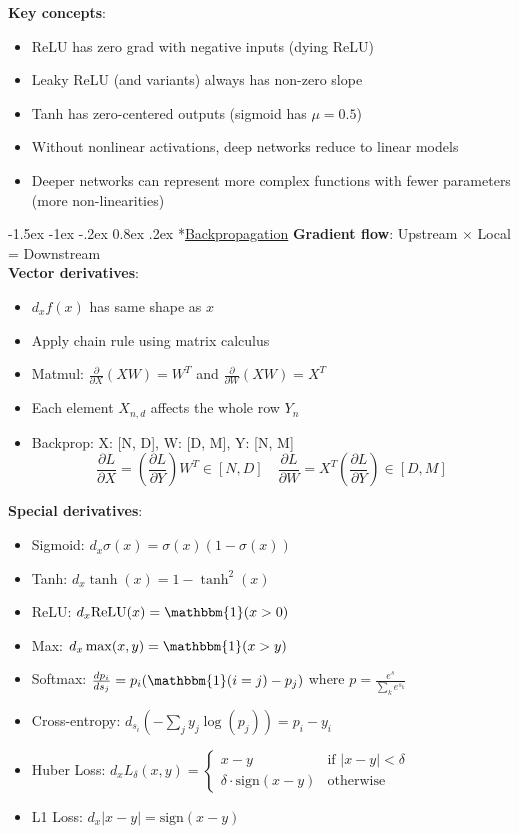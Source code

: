\documentclass{article}
\makeatletter
\renewcommand\section{\@startsection{section}{1}{\z@}%
                                  {-1.5ex \@plus -1ex \@minus -.2ex}%
                                  {0.8ex \@plus.2ex}%
                                  {\normalfont\small\bfseries}}
\makeatother
\begin{document}
\begin{multicols}{3}
\textbf{Key concepts}:
\begin{itemize}
\item ReLU has zero grad with negative inputs (dying ReLU)
\item Leaky ReLU (and variants) always has non-zero slope
\item Tanh has zero-centered outputs (sigmoid has $\mu = 0.5$)
\item Without nonlinear activations, deep networks reduce to linear models
\item Deeper networks can represent more complex functions with fewer parameters (more non-linearities)
\end{itemize}

\section*{\underline{Backpropagation}}
\textbf{Gradient flow}: Upstream $\times$ Local = Downstream\\
\textbf{Vector derivatives}:
\begin{itemize}
\item $d_x f(x)$ has same shape as $x$
\item Apply chain rule using matrix calculus
\item Matmul: $\frac{\partial}{\partial X}(XW) = W^T$ and $\frac{\partial}{\partial W}(XW) = X^T$
\item Each element $X_{n,d}$ affects the whole row $Y_{n}$
\item Backprop: X: [N, D], W: [D, M], Y: [N, M]
$$\frac{\partial L}{\partial X} = \left(\frac{\partial L}{\partial Y}\right)W^T \in [N, D]  \quad\frac{\partial L}{\partial W} = X^T\left(\frac{\partial L}{\partial Y}\right) \in [D, M]$$
\end{itemize}
\textbf{Special derivatives}:
\begin{itemize}
\item Sigmoid: $d_x \sigma(x) = \sigma(x)(1-\sigma(x))$
\item Tanh: $d_x \tanh(x) = 1 - \tanh^2(x)$
\item ReLU: $d_x \text{ReLU}(x) = \mathbbm{1}(x > 0)$
\item Max: $d_x \max(x, y) = \mathbbm{1}(x > y)$
\item Softmax: $\frac{d p_i}{d s_j} = p_i(\mathbbm{1}(i=j) - p_j)$ where $p = \frac{e^{s}}{\sum_k e^{s_k}}$
\item Cross-entropy: $d_{s_i} \left(-\sum_j y_j\log(p_j)\right) = p_i - y_i$
\item Huber Loss: $d_x L_{\delta}(x,y) = \begin{cases} x-y & \text{if } |x-y| < \delta \\ \delta \cdot \text{sign}(x-y) & \text{otherwise} \end{cases}$
\item L1 Loss: $d_x |x-y| = \text{sign}(x-y)$
\end{itemize}


\end{multicols}
\end{document}
